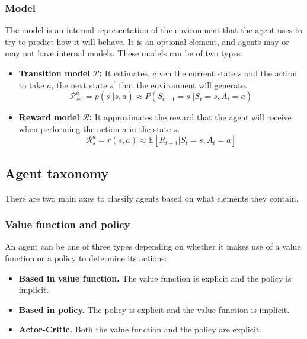 \subsubsection*{Model}

The model is an internal representation of the environment that the agent uses to try to predict how it will behave. It is an optional element, and agents may or may not have internal models. These models can be of two types:

\begin{itemize}
    \item \textbf{Transition model $\mathcal{P}$:} It estimates, given the current state $s$ and the action to take $a$, the next state $s^\prime$ that the environment will generate.
    \begin{equation}
        \mathcal{P}^a_{ss^\prime} = p(s^\prime|s,a) \approx P(S_{t+1} = s^\prime|S_t = s, A_t = a)
    \end{equation}
    \item \textbf{Reward model $\mathcal{R}$:} It approximates the reward that the agent will receive when performing the action $a$ in the state $s$.
    \begin{equation}
        \mathcal{R}^a_s = r(s,a) \approx \mathbb{E}[R_{t+1}| S_t = s, A_t = a]
    \end{equation}
\end{itemize}

\subsection{Agent taxonomy}

There are two main axes to classify agents based on what elements they contain.

\subsubsection*{Value function and policy}

An agent can be one of three types depending on whether it makes use of a value function or a policy to determine its actions:

\begin{itemize}
    \item \textbf{Based in value function.} The value function is explicit and the policy is implicit.
    \item \textbf{Based in policy.} The policy is explicit and the value function is implicit.
    \item \textbf{Actor-Critic.} Both the value function and the policy are explicit.
\end{itemize}

